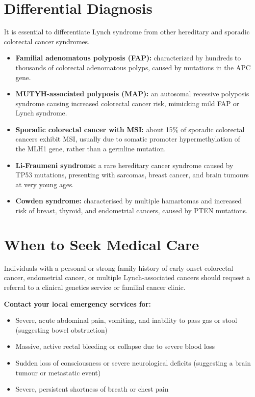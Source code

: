 \section*{Differential Diagnosis}
It is essential to differentiate Lynch syndrome from other hereditary and sporadic colorectal cancer syndromes.
\begin{itemize}
    \item \textbf{Familial adenomatous polyposis (FAP):} characterized by hundreds to thousands of colorectal adenomatous polyps, caused by mutations in the APC gene.
    \item \textbf{MUTYH-associated polyposis (MAP):} an autosomal recessive polyposis syndrome causing increased colorectal cancer risk, mimicking mild FAP or Lynch syndrome.
    \item \textbf{Sporadic colorectal cancer with MSI:} about 15\% of sporadic colorectal cancers exhibit MSI, usually due to somatic promoter hypermethylation of the MLH1 gene, rather than a germline mutation.
    \item \textbf{Li-Fraumeni syndrome:} a rare hereditary cancer syndrome caused by TP53 mutations, presenting with sarcomas, breast cancer, and brain tumours at very young ages.
    \item \textbf{Cowden syndrome:} characterised by multiple hamartomas and increased risk of breast, thyroid, and endometrial cancers, caused by PTEN mutations.
\end{itemize}

\section*{When to Seek Medical Care}
Individuals with a personal or strong family history of early-onset colorectal cancer, endometrial cancer, or multiple Lynch-associated cancers should request a referral to a clinical genetics service or familial cancer clinic.

\textbf{Contact your local emergency services for:}
\begin{itemize}
    \item Severe, acute abdominal pain, vomiting, and inability to pass gas or stool (suggesting bowel obstruction)
    \item Massive, active rectal bleeding or collapse due to severe blood loss
    \item Sudden loss of consciousness or severe neurological deficits (suggesting a brain tumour or metastatic event)
    \item Severe, persistent shortness of breath or chest pain
\end{itemize}

